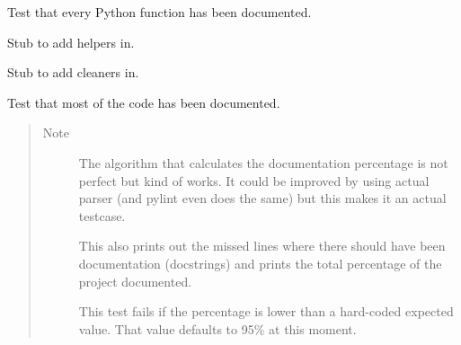 \documentclass[letterpaper,10pt,english]{sphinxmanual}
\begin{document}
\begin{fulllineitems}
\label{testing:testing.TestDocumentation}
Test that every Python function has been documented.

\begin{fulllineitems}
\label{testing:testing.TestDocumentation.setUp}
Stub to add helpers in.

\end{fulllineitems}


\begin{fulllineitems}
\label{testing:testing.TestDocumentation.tearDown}
Stub to add cleaners in.

\end{fulllineitems}


\begin{fulllineitems}
\label{testing:testing.TestDocumentation.test_documentation}
Test that most of the code has been documented.
\begin{quote}\begin{description}
\item[{Note }] \leavevmode
The algorithm that calculates the documentation percentage
is not perfect but kind of works. It could be improved
by using actual parser (and pylint even does the same) but
this makes it an actual testcase.

This also prints out the missed lines where there should have
been documentation (docstrings) and prints the total percentage
of the project documented.

This test fails if the percentage is lower than a hard-coded
expected value. That value defaults to 95\% at this moment.

\end{description}\end{quote}

\end{fulllineitems}


\end{fulllineitems}
\end{document}
